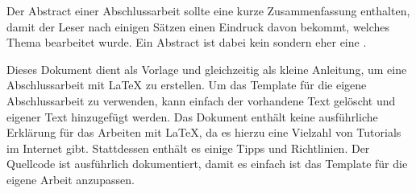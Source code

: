 Der Abstract einer Abschlussarbeit sollte eine kurze Zusammenfassung enthalten, damit der Leser nach einigen Sätzen einen Eindruck davon bekommt, welches Thema bearbeitet wurde.
Ein Abstract ist dabei kein  sondern eher eine .

Dieses Dokument dient als Vorlage und gleichzeitig als kleine Anleitung, um eine Abschlussarbeit mit \LaTeX{} zu erstellen. Um das Template für die eigene Abschlussarbeit zu verwenden, kann einfach der vorhandene Text gelöscht und eigener Text hinzugefügt werden. Das Dokument enthält keine ausführliche Erklärung für das Arbeiten mit \LaTeX{}, da es hierzu eine Vielzahl von Tutorials im Internet gibt. Stattdessen enthält es einige Tipps und Richtlinien. Der Quellcode ist ausführlich dokumentiert, damit es einfach ist das Template für die eigene Arbeit anzupassen.